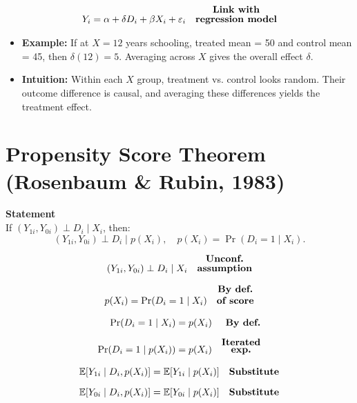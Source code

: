 \documentclass[12pt]{article}
\begin{document}
\singlespacing
\begin{align}
Y_i 
  &= \alpha + \delta D_i + \beta X_i + \varepsilon_i 
  & \text{\textbf{\shortstack{Link with \\ regression model}}}
\end{align}

\begin{itemize}
    \item \textbf{Example:} If at $X=12$ years schooling, treated mean = 50 and control mean = 45, then $\delta(12)=5$. Averaging across $X$ gives the overall effect $\delta$.
    \item \textbf{Intuition:} Within each $X$ group, treatment vs. control looks random. Their outcome difference is causal, and averaging these differences yields the treatment effect.
\end{itemize}

\section*{\noindent\textbf{Propensity Score Theorem (Rosenbaum \& Rubin, 1983)}}

\textbf{Statement} \\
If $(Y_{1i}, Y_{0i}) \perp D_i \mid X_i$, then:
\[
(Y_{1i}, Y_{0i}) \perp D_i \mid p(X_i), 
\quad p(X_i) = \Pr(D_i=1 \mid X_i).
\]

\singlespacing
\begin{align}
(Y_{1i}, Y_{0i}) \perp D_i \mid X_i 
   & & \text{\textbf{\shortstack{Unconf. \\ assumption}}}
\end{align}

\singlespacing
\begin{align}
p(X_i) &= \Pr(D_i=1 \mid X_i) 
   & \text{\textbf{\shortstack{By def. \\ of score}}}
\end{align}

\singlespacing
\begin{align}
\Pr(D_i=1 \mid X_i) &= p(X_i) 
   & \text{\textbf{By def.}} \\[6pt]
\Pr(D_i=1 \mid p(X_i)) &= p(X_i) 
   & \text{\textbf{\shortstack{Iterated \\ exp.}}}
\end{align}

\singlespacing
\begin{align}
\mathbb{E}[Y_{1i} \mid D_i, p(X_i)] 
   &= \mathbb{E}[Y_{1i} \mid p(X_i)] 
   & \text{\textbf{Substitute}} \\[6pt]
\mathbb{E}[Y_{0i} \mid D_i, p(X_i)] 
   &= \mathbb{E}[Y_{0i} \mid p(X_i)] 
   & \text{\textbf{Substitute}}
\end{align}
\end{document}
